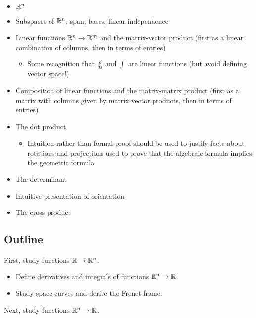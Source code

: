 \begin{itemize}
    \item $\mathbb{R}^n$
    \item Subspaces of $\mathbb{R}^n$; span, bases, linear independence
    \item Linear functions $\mathbb{R}^n \rightarrow \mathbb{R}^m$ and the matrix-vector product (first as a linear combination of columns, then in terms of entries)
    \begin{itemize}
        \item Some recognition that $\frac{d}{dx}$ and $\int$ are linear functions (but avoid defining vector space!)
    \end{itemize}
    \item Composition of linear functions and the matrix-matrix product (first as a matrix with columns given by matrix vector products, then in terms of entries)
    \item The dot product
    \begin{itemize}
        \item Intuition rather than formal proof should be used to justify facts about rotations and projections used to prove that the algebraic formula implies the geometric formula
    \end{itemize}
    \item The determinant
    \item Intuitive presentation of orientation
    \item The cross product
\end{itemize}

\subsection*{Outline}

First, study functions $\mathbb{R} \rightarrow \mathbb{R}^n$.

\begin{itemize}
    \item Define derivatives and integrals of functions $\mathbb{R}^n \rightarrow \mathbb{R}$. 
    \item Study space curves and derive the Frenet frame.
\end{itemize}

Next, study functions $\mathbb{R}^n \rightarrow \mathbb{R}$.
    
